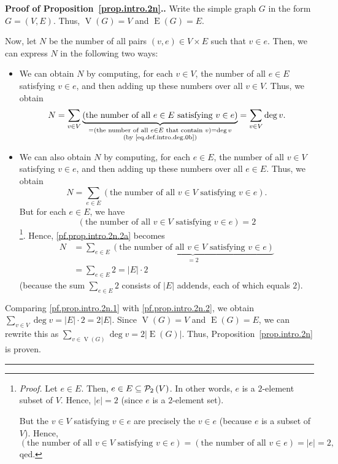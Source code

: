 \documentclass[numbers=enddot,12pt,final,onecolumn,notitlepage]{scrartcl}%
\theoremstyle{definition}
\newenvironment{proof}[1][Proof]{\noindent\textbf{#1.} }{\ \rule{0.5em}{0.5em}}
\let\sumnonlimits\sum
\renewcommand{\sum}{\sumnonlimits\limits}
\newcommand{\powset}[2][]{\ifthenelse{\equal{#2}{}}{\mathcal{P}\left(#1\right)}{\mathcal{P}_{#1}\left(#2\right)}}
\newcommand{\abs}[1]{\left| #1 \right|}
\newcommand{\tup}[1]{\left( #1 \right)}
\newcommand{\verts}[1]{\operatorname{V}\left( #1 \right)}
\newcommand{\edges}[1]{\operatorname{E}\left( #1 \right)}
\begin{document}
\begin{proof}[Proof of Proposition~\ref{prop.intro.2n}.]
Write the simple graph $G$ in the form $G = \tup{V, E}$. Thus,
$\verts{G} = V$ and $\edges{G} = E$.

Now, let $N$ be the number of all pairs $\tup{v, e} \in V \times E$
such that $v \in e$. Then, we can express $N$ in the following two
ways:

\begin{itemize}
\item We can obtain $N$ by computing, for each $v \in V$, the number
of all $e \in E$ satisfying $v \in e$, and then adding up these
numbers over all $v \in V$. Thus, we obtain
\begin{equation}
N
= \sum_{v \in V}
  \underbrace{\left(\text{the number of all } e \in E
                \text{ satisfying } v \in e\right)}_{
              \substack{= \left(\text{the number of all } e \in E
                \text{ that contain } v \right) = \deg v \\
                \text{(by \eqref{eq.def.intro.deg.0b}})}}
= \sum_{v \in V} \deg v .
\label{pf.prop.intro.2n.1}
\end{equation}

\item We can also obtain $N$ by computing, for each $e \in E$, the
number of all $v \in V$ satisfying $v \in e$, and then adding up these
numbers over all $e \in E$. Thus, we obtain
\begin{equation}
N
= \sum_{e \in E}
   \left(\text{the number of all } v \in V
          \text{ satisfying } v \in e\right) .
\label{pf.prop.intro.2n.2a}
\end{equation}
But for each $e \in E$, we have
\[
\left(\text{the number of all } v \in V
          \text{ satisfying } v \in e\right) = 2
\]
\footnote{\textit{Proof.} Let $e \in E$. Then,
$e \in E \subseteq \powset[2]{V}$. In other words, $e$ is a
$2$-element subset of $V$. Hence, $\abs{e} = 2$ (since $e$ is a
$2$-element set).

But the $v \in V$ satisfying $v \in e$ are precisely the $v \in e$
(because $e$ is a subset of $V$). Hence,
\[
\left(\text{the number of all } v \in V
          \text{ satisfying } v \in e\right)
= \left(\text{the number of all } v \in e \right)
= \abs{e} = 2 ,
\]
qed.}. Hence, \eqref{pf.prop.intro.2n.2a} becomes
\begin{align}
N
&= \sum_{e \in E}
   \underbrace{\left(\text{the number of all } v \in V
                 \text{ satisfying } v \in e\right)}_{= 2}
\\
&= \sum_{e \in E} 2 = \abs{E} \cdot 2
\label{pf.prop.intro.2n.2}
\end{align}
(because the sum $\sum_{e \in E} 2$ consists of $\abs{E}$ addends,
each of which equals $2$).
\end{itemize}

Comparing \eqref{pf.prop.intro.2n.1} with \eqref{pf.prop.intro.2n.2},
we obtain $\sum_{v \in V} \deg v = \abs{E} \cdot 2 = 2 \abs{E}$.
Since $\verts{G} = V$ and $\edges{G} = E$, we can rewrite this as
$\sum_{v \in \verts{G}} \deg v = 2 \abs{\edges{G}}$.
Thus, Proposition~\ref{prop.intro.2n} is proven.
\end{proof}
\end{document}
